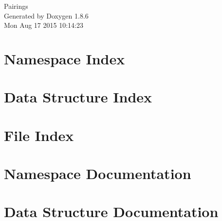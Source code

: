 \documentclass[twoside]{book}
\newcommand{\clearemptydoublepage}{%
  \newpage{\pagestyle{empty}\cleardoublepage}%
}
\begin{document}
\hypersetup{pageanchor=false}
\begin{titlepage}
\vspace*{7cm}
\begin{center}%
{\Large Pairings }\\
\vspace*{1cm}
{\large Generated by Doxygen 1.8.6}\\
\vspace*{0.5cm}
{\small Mon Aug 17 2015 10:14:23}\\
\end{center}
\end{titlepage}
\clearemptydoublepage
\tableofcontents
\clearemptydoublepage
{}
\hypersetup{pageanchor=true}

\chapter{Namespace Index}

\chapter{Data Structure Index}

\chapter{File Index}

\chapter{Namespace Documentation}




\chapter{Data Structure Documentation}












\end{document}

